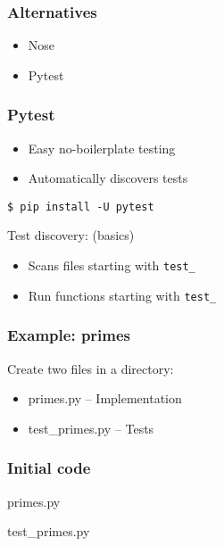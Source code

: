 
\begin{frame}\frametitle{Alternatives}

\begin{itemize}
    \item Nose
    \item Pytest
\end{itemize}

\end{frame}


\begin{frame}[fragile]\frametitle{Pytest}

\begin{itemize}
    \item Easy no-boilerplate testing
    \item Automatically discovers tests
\end{itemize}

\begin{verbatim}
$ pip install -U pytest
\end{verbatim}


Test discovery: (basics)
\begin{itemize}
    \item Scans files starting with \texttt{test\_}
    \item Run functions starting with \texttt{test\_}
\end{itemize}

\end{frame}

\begin{frame}\frametitle{Example: primes}

    Create two files in a directory:

    \begin{itemize}
        \item primes.py -- Implementation
        \item test\_primes.py -- Tests
    \end{itemize}

\end{frame}

\begin{frame}\frametitle{Initial code}

primes.py

test\_primes.py

\end{frame}

